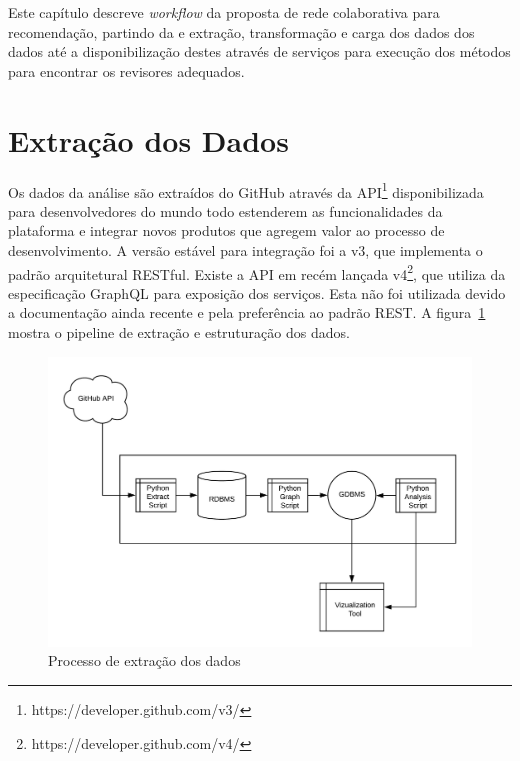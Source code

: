 \documentclass[a4paper,12pt]{monografia}
\theoremstyle{plain}
\theoremstyle{definition}
\theoremstyle{remark}
\begin{document}
Este capítulo descreve \textit{workflow} da proposta de rede colaborativa para recomendação, partindo da e extração, transformação e carga dos dados dos dados até a disponibilização destes através de serviços para execução dos métodos para encontrar os revisores adequados.

\section{Extração dos Dados}

Os dados da análise são extraídos do GitHub através da API\footnote{https://developer.github.com/v3/} disponibilizada para desenvolvedores do mundo todo estenderem as funcionalidades da plataforma e integrar novos produtos que agregem valor ao processo de desenvolvimento. A versão estável para integração foi a v3, que implementa o padrão arquitetural RESTful\cite{fielding2002}. Existe a API em recém lançada v4\footnote{https://developer.github.com/v4/}, que utiliza da especificação GraphQL para exposição dos serviços. Esta não foi utilizada devido a documentação ainda recente e pela preferência ao padrão REST. A figura~\ref{fig:processo_extracao} mostra o pipeline de extração e estruturação dos dados.

\begin{figure}[!htbp]
 \includegraphics[width=\textwidth]{processo_extracao}
 \caption{Processo de extração dos dados}\label{fig:processo_extracao}
\end{figure}
\end{document}
